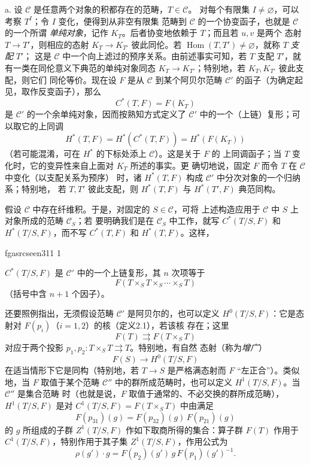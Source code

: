 \documentclass[12pt,twoside,openany]{book}
\numberwithin{equation}{section}
\newcommand{\fgaunitid}{unbound}
\newcommand{\src}[1]{%
  \phantomsection
  \hypertarget{src:\fgaunitid:#1}{}%
  \hypertarget{fga.\fgaunitid.p#1}{}%
  \ifcsname fgasrcseen#1\endcsname\else
    \expandafter\gdef\csname fgasrcseen#1\endcsname{1}%
    \hypertarget{src:#1}{}%
  \fi
  \marginpar{\raggedleft\footnotesize\sffamily #1}%
}
\newcommand{\fquote}[1]{“#1”}
\theoremstyle{plain}
\theoremstyle{definition}
\theoremstyle{remark}
\begin{document}
\medskip\noindent
a. 设 $\mathcal C$ 是任意两个对象的积都存在的范畴，$T\in\mathcal C$。
对每个有限集 $I\ne\varnothing$，可以考察 $T^I$；令 $I$ 变化，便得到从非空有限集
范畴到 $\mathcal C$ 的一个协变函子，也就是 $\mathcal C$ 的一个所谓
\emph{单纯对象}，记作 $K_T$。后者协变地依赖于 $T$；而且若 $u,v$ 是两个
态射 $T\longrightarrow T'$，则相应的态射
$K_T\longrightarrow K_{T'}$ 彼此同伦。若
$\operatorname{Hom}(T,T')\ne\varnothing$，就称 $T$ \emph{支配} $T'$；
这是 $\mathcal C$ 中一个向上滤过的预序关系。由前述事实可知，若 $T$ 支配
$T'$，就有一类在同伦意义下典范的单纯对象同态
$K_T\longrightarrow K_{T'}$；特别地，若 $K_T,K_{T'}$ 彼此支配，则它们
同伦等价。现在设 $F$ 是从 $\mathcal C$ 到某个阿贝尔范畴
$\mathcal C'$ 的函子（为确定起见，取作反变函子），那么
\[
  C^*(T,F)=F(K_T)
\]
是 $\mathcal C'$ 的一个余单纯对象，因而按熟知方式定义了
$\mathcal C'$ 中的一个（上链）复形；可以取它的上同调
\[
  H^*(T,F)=H^*(C^*(T,F))=H^*(F(K_T))
\]
（若可能混淆，可在 $H^*$ 的下标处添上 $\mathcal C$）。这是关于 $F$ 的
上同调函子；当 $T$ 变化时，它的变异性来自上面对 $K_T$ 所述的事实。更
确切地说，固定 $F$ 而令 $T$ 在 $\mathcal C$ 中变化（以支配关系为预序）
时，诸 $H^*(T,F)$ 构成 $\mathcal C'$ 中分次对象的一个归纳系；特别地，
若 $T,T'$ 彼此支配，则 $H^*(T,F)$ 与 $H^*(T',F)$ 典范同构。

假设 $\mathcal C$ 中存在纤维积。于是，对固定的 $S\in\mathcal C$，可将
上述构造应用于 $\mathcal C$ 中 $S$ 上对象所成的范畴 $\mathcal C_S$；若
要明确我们是在 $\mathcal C_S$ 中工作，就写 $C^*(T/S,F)$ 和
$H^*(T/S,F)$，而不写 $C^*(T,F)$ 和 $H^*(T,F)$。这样，

\src{311}
$C^*(T/S,F)$ 是 $\mathcal C'$ 中的一个上链复形，其 $n$ 次项等于
\[
  F(T\times_ST\times_S\cdots\times_ST)
\]
（括号中含 $n+1$ 个因子）。

还要照例指出，无须假设范畴 $\mathcal C'$ 是阿贝尔的，也可以定义
$H^0(T/S,F)$：它是态射对 $F(p_i)$（$i=1,2$）的核（定义2.1），若该核
存在；这里
\[
  F(T)\rightrightarrows F(T\times_ST)
\]
对应于两个投影 $p_1,p_2:T\times_ST\rightrightarrows T$。特别地，有自然
态射（称为\emph{增广}）
\[
  F(S)\longrightarrow H^0(T/S,F)
\]
在适当情形下它是同构（特别地，若 $T\longrightarrow S$ 是严格满态射而
$F$ \fquote{左正合}）。类似地，当 $F$ 取值于某个范畴 $\mathcal C''$
中的群所成范畴时，也可以定义 $H^1(T/S,F)$。当 $\mathcal C''$ 是集合范畴
时（也就是说，$F$ 取值于通常的、不必交换的群所成范畴），
$H^1(T/S,F)$ 是对 $C^1(T/S,F)=F(T\times_ST)$ 中由满足
\[
  F(p_{31})(g)=F(p_{32})(g)\,F(p_{21})(g)
\]
的 $g$ 所组成的子群 $Z^1(T/S,F)$ 作如下取商所得的集合：算子群 $F(T)$
作用于 $C^1(T/S,F)$，特别作用于其子集 $Z^1(T/S,F)$，作用公式为
\[
  \rho(g')\cdot g=F(p_2)(g')\,g\,F(p_1)(g')^{-1}.
\]
\end{document}
